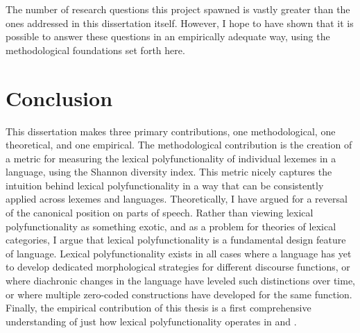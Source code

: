 The number of research questions this project spawned is vastly greater than the ones addressed in this dissertation itself. However, I hope to have shown that it is possible to answer these questions in an empirically adequate way, using the methodological foundations set forth here.

\section{Conclusion}
\label{sec:5.5}

This dissertation makes three primary contributions, one methodological, one theoretical, and one empirical. The methodological contribution is the creation of a metric for measuring the lexical polyfunctionality of individual lexemes in a language, using the Shannon diversity index. This metric nicely captures the intuition behind lexical polyfunctionality in a way that can be consistently applied across lexemes and languages. Theoretically, I have argued for a reversal of the canonical position on parts of speech. Rather than viewing lexical polyfunctionality as something exotic, and as a problem for theories of lexical categories, I argue that lexical polyfunctionality is a fundamental design feature of language. Lexical polyfunctionality exists in all cases where a language has yet to develop dedicated morphological strategies for different discourse functions, or where diachronic changes in the language have leveled such distinctions over time, or where multiple zero-coded constructions have developed for the same function. Finally, the empirical contribution of this thesis is a first comprehensive understanding of just how lexical polyfunctionality operates in  and .
